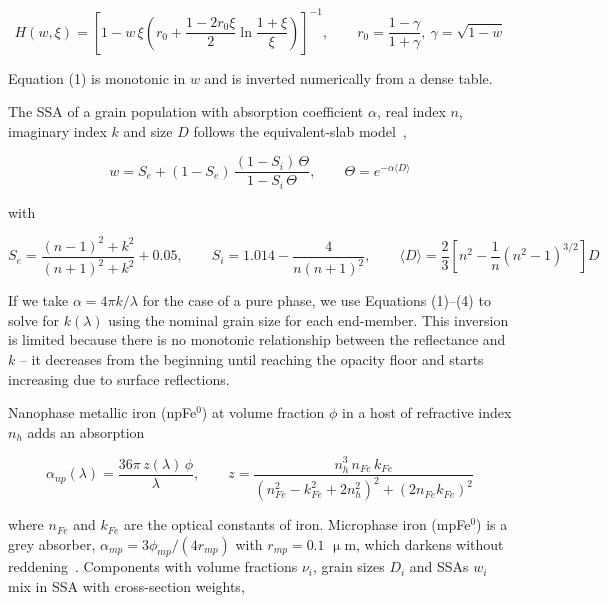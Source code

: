 \documentclass[remotesensing,article,submit,pdftex,moreauthors]{Definitions/mdpi}
\begin{document}
\begin{equation}
H(w,\xi) = \left[1 - w\,\xi\left(r_0 + \frac{1-2r_0\xi}{2}\ln\frac{1+\xi}{\xi}\right)\right]^{-1},\qquad r_0=\frac{1-\gamma}{1+\gamma},\ \gamma=\sqrt{1-w}
\label{eq2}
\end{equation}

Equation (1) is monotonic in $w$ and is inverted numerically from a dense table.

The SSA of a grain population with absorption coefficient $\alpha$, real index $n$, imaginary index $k$ and size $D$ follows the equivalent-slab model~\cite{hapke1993},

\begin{equation}
w = S_e + (1-S_e)\,\frac{(1-S_i)\,\Theta}{1-S_i\,\Theta},\qquad \Theta = e^{-\alpha\langle D\rangle}
\label{eq3}
\end{equation}

with

\begin{equation}
S_e = \frac{(n-1)^2+k^2}{(n+1)^2+k^2} + 0.05,\qquad S_i = 1.014 - \frac{4}{n(n+1)^2},\qquad \langle D\rangle = \frac{2}{3}\left[n^2-\frac{1}{n}(n^2-1)^{3/2}\right]D
\label{eq4}
\end{equation}

If we take $\alpha = 4\pi k/\lambda$ for the case of a pure phase, we use Equations (1)--(4) to solve for $k(\lambda)$ using the nominal grain size for each end-member. This inversion is limited because there is no monotonic relationship between the reflectance and $k$ -- it decreases from the beginning until reaching the opacity floor and starts increasing due to surface reflections.

Nanophase metallic iron (npFe$^{0}$) at volume fraction $\phi$ in a host of refractive index $n_h$ adds an absorption~\cite{hapke2001,lucey2011}

\begin{equation}
\alpha_{np}(\lambda) = \frac{36\pi\, z(\lambda)\,\phi}{\lambda},\qquad z = \frac{n_h^3\, n_{Fe}\, k_{Fe}}{\left(n_{Fe}^2-k_{Fe}^2+2n_h^2\right)^2+\left(2n_{Fe}k_{Fe}\right)^2}
\label{eq5}
\end{equation}

where $n_{Fe}$ and $k_{Fe}$ are the optical constants of iron. Microphase iron (mpFe$^{0}$) is a grey absorber, $\alpha_{mp} = 3\phi_{mp}/(4 r_{mp})$ with $r_{mp} = 0.1$ $\upmu$m, which darkens without reddening~\cite{lucey2011}. Components with volume fractions $\nu_i$, grain sizes $D_i$ and SSAs $w_i$ mix in SSA with cross-section weights,
\end{document}
